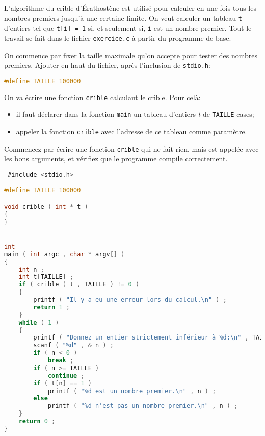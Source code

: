 \titre{\ttableaux}




\prerequis {}

L'algorithme du crible d'Érathostène est utilisé pour calculer en une
fois tous les nombres premiers jusqu'à une certaine limite. On veut
calculer un tableau \texttt{t} d'entiers tel que \texttt{t[i] = 1} si,
et seulement si, \texttt{i} est un nombre premier. Tout le travail se
fait dans le fichier \texttt{exercice.c} à partir
du programme de base.

\question On commence par fixer la taille maximale qu'on accepte pour
tester des nombres premiers. Ajouter en haut du fichier, après
l'inclusion de \texttt{stdio.h}:
\begin{lstlisting}[language=C]
#define TAILLE 100000
\end{lstlisting}

\question On va écrire une fonction \texttt{crible} calculant le crible. Pour celà:
\begin{itemize}
\item il faut déclarer dans la fonction \texttt{main} un tableau
  d'entiers \emph{t} de \texttt{TAILLE} cases;
\item appeler la fonction \texttt{crible} avec l'adresse de ce tableau
  comme paramètre.
\end{itemize}
Commencez par écrire une fonction \texttt{crible} qui ne fait rien,
mais est appelée avec les bons arguments, et vérifiez que le programme
compile correctement.

\begin{solutioncachee}
  \begin{lstlisting}[language=C]
 #include <stdio.h>

#define TAILLE 100000

void crible ( int * t )
{
}


int
main ( int argc , char * argv[] )
{
    int n ;
    int t[TAILLE] ;
    if ( crible ( t , TAILLE ) != 0 )
    {
        printf ( "Il y a eu une erreur lors du calcul.\n" ) ;
        return 1 ;
    }
    while ( 1 )
    {
        printf ( "Donnez un entier strictement inférieur à %d:\n" , TAILLE ) ;
        scanf ( "%d" , & n ) ;
        if ( n < 0 )
            break ;
        if ( n >= TAILLE )
            continue ;
        if ( t[n] == 1 )
            printf ( "%d est un nombre premier.\n" , n ) ;
        else
            printf ( "%d n'est pas un nombre premier.\n" , n ) ;
    }
    return 0 ;
} 
  \end{lstlisting}
\end{solutioncachee}

